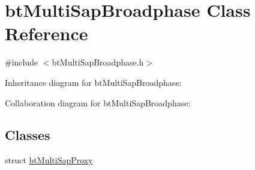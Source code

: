 \hypertarget{classbt_multi_sap_broadphase}{\section{bt\+Multi\+Sap\+Broadphase Class Reference}
\label{classbt_multi_sap_broadphase}
}


{\ttfamily \#include $<$bt\+Multi\+Sap\+Broadphase.\+h$>$}



Inheritance diagram for bt\+Multi\+Sap\+Broadphase\+:


Collaboration diagram for bt\+Multi\+Sap\+Broadphase\+:
\subsection*{Classes}
\begin{DoxyCompactItemize}
\item 
struct \hyperlink{structbt_multi_sap_broadphase_1_1bt_multi_sap_proxy}{bt\+Multi\+Sap\+Proxy}
\end{DoxyCompactItemize}
